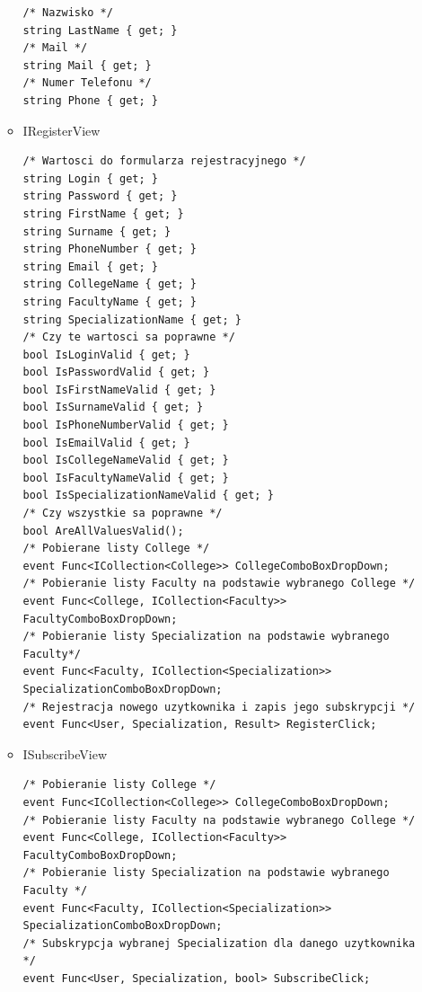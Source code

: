 \documentclass[12pt,a4paper]{article}
\begin{document}
\begin{itemize}
\begin{itemize}
\begin{lstlisting}
/* Nazwisko */
string LastName { get; }
/* Mail */
string Mail { get; }
/* Numer Telefonu */
string Phone { get; }
					\end{lstlisting}
 					\item IRegisterView
					\begin{lstlisting}
/* Wartosci do formularza rejestracyjnego */
string Login { get; }
string Password { get; }
string FirstName { get; }
string Surname { get; }
string PhoneNumber { get; }
string Email { get; }
string CollegeName { get; }
string FacultyName { get; }
string SpecializationName { get; }
/* Czy te wartosci sa poprawne */
bool IsLoginValid { get; }
bool IsPasswordValid { get; }
bool IsFirstNameValid { get; }
bool IsSurnameValid { get; }
bool IsPhoneNumberValid { get; }
bool IsEmailValid { get; }
bool IsCollegeNameValid { get; }
bool IsFacultyNameValid { get; }
bool IsSpecializationNameValid { get; }
/* Czy wszystkie sa poprawne */
bool AreAllValuesValid();
/* Pobierane listy College */
event Func<ICollection<College>> CollegeComboBoxDropDown;
/* Pobieranie listy Faculty na podstawie wybranego College */
event Func<College, ICollection<Faculty>> FacultyComboBoxDropDown;
/* Pobieranie listy Specialization na podstawie wybranego Faculty*/
event Func<Faculty, ICollection<Specialization>> SpecializationComboBoxDropDown;
/* Rejestracja nowego uzytkownika i zapis jego subskrypcji */
event Func<User, Specialization, Result> RegisterClick;

					\end{lstlisting}
					\item ISubscribeView 
					\begin{lstlisting}		
/* Pobieranie listy College */
event Func<ICollection<College>> CollegeComboBoxDropDown;
/* Pobieranie listy Faculty na podstawie wybranego College */
event Func<College, ICollection<Faculty>> FacultyComboBoxDropDown;
/* Pobieranie listy Specialization na podstawie wybranego Faculty */
event Func<Faculty, ICollection<Specialization>> SpecializationComboBoxDropDown;
/* Subskrypcja wybranej Specialization dla danego uzytkownika */
event Func<User, Specialization, bool> SubscribeClick;
			        \end{lstlisting}
				\end{itemize}
			\end{itemize}
\clearpage
\end{document}
